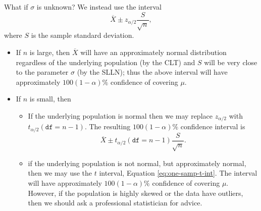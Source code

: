 \documentclass[captions=tableheading]{scrbook}
\begin{document}
\begin{rem}
What if \(\sigma\) is unknown? We instead use the interval
\begin{equation}
\overline{X}\pm z_{\alpha/2}\frac{S}{\sqrt{n}},
\end{equation}
where \(S\) is the sample standard deviation.
\begin{itemize}
\item If \(n\) is large, then \(\overline{X}\) will have an approximately normal distribution regardless of the underlying population (by the CLT) and \(S\) will be very close to the parameter \(\sigma\) (by the SLLN); thus the above interval will have approximately \(100(1-\alpha)\%\) confidence of covering \(\mu\).
\item If \(n\) is small, then
\begin{itemize}
\item If the underlying population is normal then we may replace \(z_{\alpha/2}\) with \(t_{\alpha/2}(\mathtt{df}=n-1)\). The resulting \(100(1-\alpha)\%\) confidence interval is
     \begin{equation}
     \overline{X}\pm t_{\alpha/2}(\mathtt{df}=n-1)\frac{S}{\sqrt{n}}.\label{eq:one-samp-t-int}
     \end{equation}
\item if the underlying population is not normal, but approximately normal, then we may use the \(t\) interval, Equation \ref{eq:one-samp-t-int}. The interval will have approximately \(100(1-\alpha)\%\) confidence of covering \(\mu\). However, if the population is highly skewed or the data have outliers, then we should ask a professional statistician for advice.
\end{itemize}
\end{itemize}

\end{rem}
\end{document}
